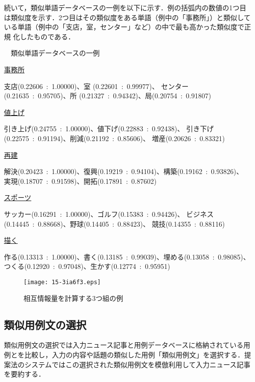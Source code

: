 \documentclass[japanese]{jnlp_1.4}
\newcounter{exp}
\def\exp#1{}
\begin{document}
続いて，類似単語データベースの一例を以下に示す．例の括弧内の数値の1つ目
は類似度を示す．2つ目はその類似度をある単語（例中の「事務所」）と類似して
いる単語（例中の「支店，室，センター」など）の中で最も高かった類似度で正規
化したものである．
\begin{screen}
\exp{nolabel01}　類似単語データベースの一例

\ul{事務所}

{\setlength{\leftskip}{1zw}
支店(0.22606~:~1.00000)、室 (0.22601~:~0.99977)、
センター(0.21635~:~0.95705)、所 (0.21327~:~0.94342)、局(0.20754~:~0.91807)
\par}

\ul{値上げ}

{\setlength{\leftskip}{1zw}
引き上げ(0.24755~:~1.00000)、値下げ(0.22883~:~0.92438)、
引き下げ(0.22575~:~0.91194)、削減(0.21192~:~0.85606)、
増産(0.20626~:~0.83321)
\par}

\ul{再建}

{\setlength{\leftskip}{1zw}
解決(0.20423~:~1.00000)、復興(0.19219~:~0.94104)、構築(0.19162~:~0.93826)、
実現(0.18707~:~0.91598)、開拓(0.17891~:~0.87602)
\par}

\ul{スポーツ}

{\setlength{\leftskip}{1zw}
サッカー(0.16291~:~1.00000)、ゴルフ(0.15383~:~0.94426)、
ビジネス(0.14445~:~0.88668)、野球(0.14405~:~0.88423)、
競技(0.14355~:~0.88116)
\par}

\ul{描く}

{\setlength{\leftskip}{1zw}
作る(0.13313~:~1.00000)、書く(0.13185~:~0.99039)、埋める(0.13058~:~0.98085)、
つくる(0.12920~:~0.97048)、生かす(0.12774~:~0.95951)
\par}
\end{screen}

\begin{figure}[t]
\begin{center}
\texttt{[image: 15-3ia6f3.eps]}
 \caption{相互情報量を計算する3つ組の例} \label{図:3つ組}
 \end{center}
\vspace{-1\baselineskip}
\end{figure}


\subsection{類似用例文の選択}\label{節:類似用例文の選択}

類似用例文の選択では入力ニュース記事と用例データベースに格納されている用
例とを比較し，入力の内容や話題の類似した用例「類似用例文」を選択する．提
案法のシステムではこの選択された類似用例文を模倣利用して入力ニュース記事
を要約する．
\end{document}
